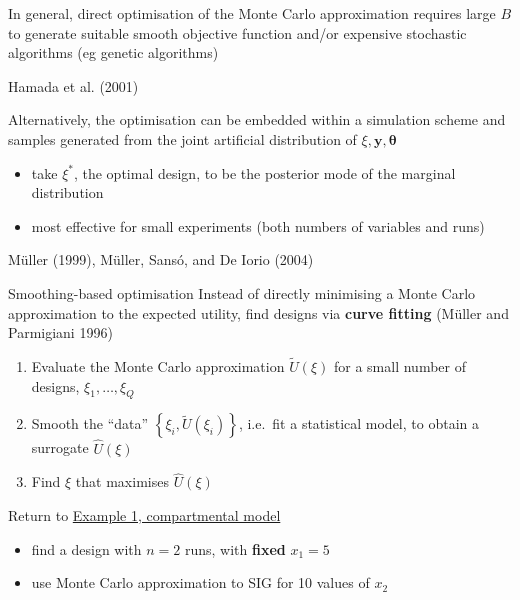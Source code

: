 \documentclass[
  ignorenonframetext,
]{beamer}
\providecommand{\tightlist}{%
  \setlength{\itemsep}{0pt}\setlength{\parskip}{0pt}}
\begin{document}
\begin{frame}{}
\protect\hypertarget{section-32}{}
In general, direct optimisation of the Monte Carlo approximation
requires large \(B\) to generate suitable smooth objective function
and/or expensive stochastic algorithms (eg genetic algorithms)

Hamada et al. (2001)

Alternatively, the optimisation can be embedded within a simulation
scheme and samples generated from the joint artificial distribution of
\(\xi,\boldsymbol{y},\boldsymbol{\theta}\)

\begin{itemize}
\tightlist
\item
  take \(\xi^*\), the optimal design, to be the posterior mode of the
  marginal distribution
\item
  most effective for small experiments (both numbers of variables and
  runs)
\end{itemize}

Müller (1999), Müller, Sansó, and De Iorio (2004)
\end{frame}

\begin{frame}{Smoothing-based optimisation}
\protect\hypertarget{smoothing-based-optimisation}{}
Instead of directly minimising a Monte Carlo approximation to the
expected utility, find designs via \textbf{curve fitting} (Müller and
Parmigiani 1996)

\begin{enumerate}
\tightlist
\item
  Evaluate the Monte Carlo approximation \(\tilde{U}(\xi)\) for a small
  number of designs, \(\xi_1,\ldots,\xi_Q\)
\item
  Smooth the ``data'' \(\left\{\xi_i, \tilde{U}(\xi_i)\right\}\),
  i.e.~fit a statistical model, to obtain a surrogate \(\hat{U}(\xi)\)
\item
  Find \(\xi\) that maximises \(\hat{U}(\xi)\)
\end{enumerate}

Return to \protect\hyperlink{57}{Example 1, compartmental model}

\begin{itemize}
\tightlist
\item
  find a design with \(n=2\) runs, with \textbf{fixed} \(x_1 = 5\)
\item
  use Monte Carlo approximation to SIG for 10 values of \(x_2\)
\end{itemize}
\end{frame}
\end{document}

